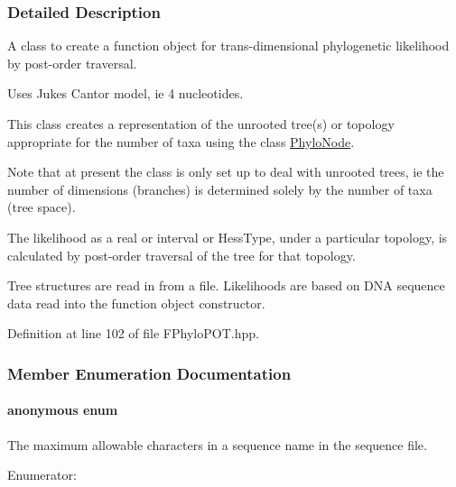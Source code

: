 \subsubsection{\-Detailed \-Description}
\-A class to create a function object for trans-\/dimensional phylogenetic likelihood by post-\/order traversal. 

\-Uses \-Jukes \-Cantor model, ie 4 nucleotides.

\-This class creates a representation of the unrooted tree(s) or topology appropriate for the number of taxa using the class \hyperlink{classPhyloNode}{\-Phylo\-Node}.

\-Note that at present the class is only set up to deal with unrooted trees, ie the number of dimensions (branches) is determined solely by the number of taxa (tree space).

\-The likelihood as a real or interval or \-Hess\-Type, under a particular topology, is calculated by post-\/order traversal of the tree for that topology.

\-Tree structures are read in from a file. \-Likelihoods are based on \-D\-N\-A sequence data read into the function object constructor. 

\-Definition at line 102 of file \-F\-Phylo\-P\-O\-T.\-hpp.



\subsubsection{\-Member \-Enumeration \-Documentation}
\hypertarget{classFPhyloPOT_a9b09c98520545b9c87c6993bf3c5f274}{\paragraph[{anonymous enum}]{\setlength{\rightskip}{0pt plus 5cm}anonymous enum}}\label{classFPhyloPOT_a9b09c98520545b9c87c6993bf3c5f274}


\-The maximum allowable characters in a sequence name in the sequence file. 

\begin{Desc}
\item[\-Enumerator\-: ]\par
\begin{description}
\item[{\em 
\hypertarget{classFPhyloPOT_a9b09c98520545b9c87c6993bf3c5f274aa74faf83373edcdf48ff35922dc009e2}{max\-Char\-In\-Seq\-Name}\label{classFPhyloPOT_a9b09c98520545b9c87c6993bf3c5f274aa74faf83373edcdf48ff35922dc009e2}
}]\end{description}
\end{Desc}



